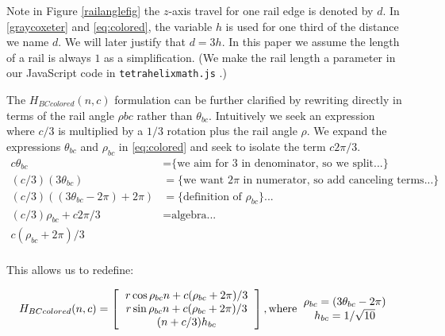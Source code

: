 \documentclass[11pt]{article}
\begin{document}
Note in Figure \ref{railanglefig} the $z$-axis travel for one rail edge is denoted by $d$. In \eqref{graycoxeter} and \eqref{eq:colored}, the variable
$h$ is used for one third of the distance we name $d$. We will later justify that $d = 3h$.
In this paper we assume the length of a rail
is always $1$ as a simplification. (We make the rail length a parameter in our JavaScript code in \texttt{tetrahelixmath.js} \cite{readtetrahelix}.)

The $H_{BCcolored}(n,c)$ formulation can be further clarified by rewriting directly in terms of the rail angle $\rho{bc}$ rather than $\theta_{bc}$.
Intuitively we seek an expression where $c/3$ is multiplied by a $1/3$ rotation plus the rail angle $\rho$.
We expand 
the expressions $\theta_{bc}$ and $\rho_{bc}$ in \eqref{eq:colored} and seek to isolate the term $c2\pi/3 $.
\begin{align*}
 c \theta_{bc}  &=   \text{\{we aim for 3 in denominator, so we split...\}} \\
    (c/3)  (3 \theta_{bc})  &=   \text{\{we want $2\pi$ in numerator, so add canceling terms...\}} \\
 (c/ 3) ((3 \theta_{bc} - 2 \pi)  + 2 \pi) &= \text{\{definition of $\rho_{bc}$\}...} \\  
  (c / 3) \rho_{bc}  + c 2 \pi /3 &=  \text{algebra...} \\  
c  ( \rho_{bc} +  2 \pi) /3  \\
\end{align*}

This allows us to redefine:

\begin{equation}
H_{BCcolored}(n,c) =
\left [
  \begin{tabular}{c}
    $ r  \cos{\rho_{bc} n + c (\rho_{bc} +  2 \pi) /3} $\\
   $ r  \sin{\rho_{bc} n + c (\rho_{bc} +  2 \pi) /3} $\\
   $ (n+c/3)  h_{bc} $
  \end{tabular}
  \right ],
\text{where}
  \begin{tabular}{c}
    $\rho_{bc} = (3 \theta_{bc} - 2 \pi)$ \\
    $ h_{bc} = 1/\sqrt{10} $ \\    
  \end{tabular}      
\end{equation}
\end{document}

